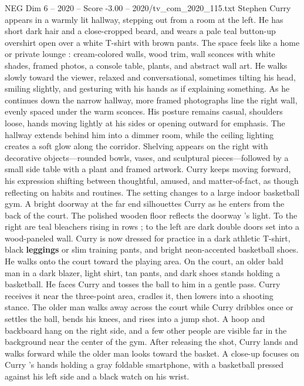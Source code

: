 \begin{textsample}{NEG Dim 6 – 2020 – Score -3.00 – 2020/tv\_com\_2020\_115.txt}  \label{ex:f6_neg_035}
Stephen Curry appears in a warmly lit hallway, stepping out from a room at the left.
He has short dark hair and a close-cropped beard, and wears a pale teal button-up overshirt open over a white T-shirt with brown pants.
The space feels like a home or private lounge : cream-colored walls, wood trim, wall sconces with white shades, framed photos, a console table, plants, and abstract wall art.
He walks slowly toward the viewer, relaxed and conversational, sometimes tilting his head, smiling slightly, and gesturing with his hands as if explaining something.
As he continues down the narrow hallway, more framed photographs line the right wall, evenly spaced under the warm sconces.
His posture remains casual, shoulders loose, hands moving lightly at his sides or opening outward for emphasis.
The hallway extends behind him into a dimmer room, while the ceiling lighting creates a soft glow along the corridor.
Shelving appears on the right with decorative objects—rounded bowls, vases, and sculptural pieces—followed by a small side table with a plant and framed artwork.
Curry keeps moving forward, his expression shifting between thoughtful, amused, and matter-of-fact, as though reflecting on habits and routines.
The setting changes to a large indoor basketball gym.
A bright doorway at the far end silhouettes Curry as he enters from the back of the court.
The polished wooden floor reflects the doorway ’s light.
To the right are teal bleachers rising in rows ; to the left are dark double doors set into a wood-paneled wall.
Curry is now dressed for practice in a dark athletic T-shirt, black \textbf{leggings} or slim training pants, and bright neon-accented basketball shoes.
He walks onto the court toward the playing area.
On the court, an older bald man in a dark blazer, light shirt, tan pants, and dark shoes stands holding a basketball.
He faces Curry and tosses the ball to him in a gentle pass.
Curry receives it near the three-point area, cradles it, then lowers into a shooting stance.
The older man walks away across the court while Curry dribbles once or settles the ball, bends his knees, and rises into a jump shot.
A hoop and backboard hang on the right side, and a few other people are visible far in the background near the center of the gym.
After releasing the shot, Curry lands and walks forward while the older man looks toward the basket.
A close-up focuses on Curry ’s hands holding a gray foldable smartphone, with a basketball pressed against his left side and a black watch on his wrist.

\end{textsample}
